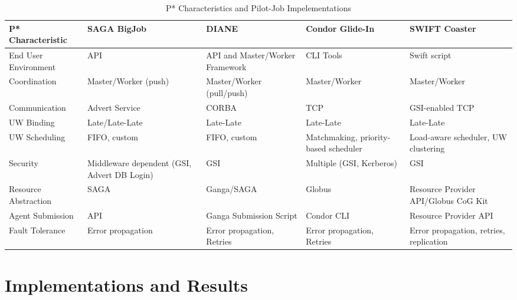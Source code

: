 \documentclass[conference,final]{IEEEtran}
\begin{document}
\begin{table}[t]
\centering
\begin{tabular}{|l|p{2.5cm}|p{2.5cm}|p{2.5cm}|p{2.5cm}|}
	\hline
	\textbf{P* Characteristic}
	&\textbf{SAGA BigJob} &\textbf{DIANE} &\textbf{Condor Glide-In} &   
	\textbf{SWIFT Coaster} \\ \hline
End User Environment &API &API and Master/Worker Framework &CLI Tools &Swift script\\ \hline

Coordination &Master/Worker (push) &Master/Worker (pull/push) &Master/Worker &Master/Worker \\ \hline
	
Communication &Advert Service &CORBA &TCP &GSI-enabled TCP \\ \hline

UW Binding &Late/Late-Late &Late-Late &Late-Late &Late-Late\\
\hline
UW Scheduling &FIFO, custom &FIFO, custom &Matchmaking, priority-based scheduler 
&Load-aware scheduler, UW clustering\\
\hline

Security &Middleware dependent (GSI, Advert DB Login) &GSI &Multiple (GSI, 
Kerberos) &GSI\\ \hline

Resource Abstraction &SAGA &Ganga/SAGA &Globus &Resource Provider API/Globus CoG 
Kit \\ 
\hline
Agent Submission &API &Ganga Submission Script &Condor CLI 
&Resource Provider API\\
\hline
Fault Tolerance &Error propagation &Error propagation, Retries &Error propagation, Retries &Error propagation, retries, replication\\
\hline
	
\end{tabular}
\caption{P* Characteristics and Pilot-Job Impelementations}\label{table:pilot-job-comparison}
\end{table}

\section{Implementations and Results}
\end{document}
